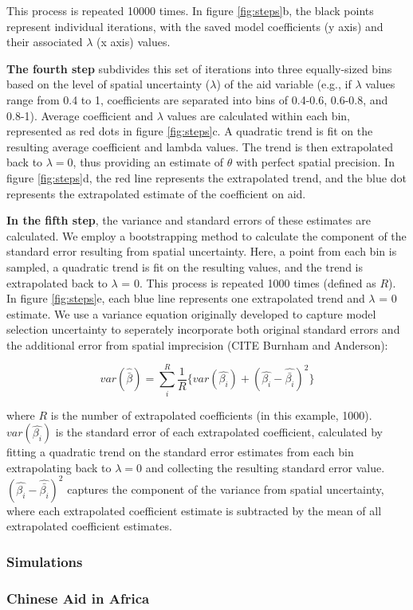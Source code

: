 This process is repeated 10000 times. 
In figure \ref{fig:steps}b, the black points represent individual iterations, with the saved model coefficients (y axis) and their associated $\lambda$ (x axis) values. 
\par
\textbf{The fourth step} subdivides this set of iterations into three equally-sized bins based on the level of spatial uncertainty ($\lambda$) of the aid variable (e.g., if $\lambda$ values range from 0.4 to 1, coefficients are separated into bins of 0.4-0.6, 0.6-0.8, and 0.8-1). 
Average coefficient and $\lambda$ values are calculated within each bin, represented as red dots in figure \ref{fig:steps}c. 
A quadratic trend is fit on the resulting average coefficient and lambda values. 
The trend is then extrapolated back to $\lambda=0$, thus providing an estimate of $\theta$ with perfect spatial precision. 
In figure \ref{fig:steps}d, the red line represents the extrapolated trend, and the blue dot represents the extrapolated estimate of the coefficient on aid. 
\par 

\textbf{In the fifth step}, the variance and standard errors of these estimates are calculated. 
We employ a bootstrapping method to calculate the component of the standard error resulting from spatial uncertainty. Here, a point from each bin is sampled, a quadratic trend is fit on the resulting values, and the trend is extrapolated back to $\lambda$ = 0. 
This process is repeated 1000 times (defined as $R$). 
In figure \ref{fig:steps}e, each blue line represents one extrapolated trend and $\lambda$ = 0 estimate. 
We use a variance equation originally developed to capture model selection uncertainty to seperately incorporate both original standard errors and the additional error from spatial imprecision (CITE Burnham and Anderson):

\begin{equation}\label{variance}
var(\hat{\bar{\beta}}) = \sum_i^R \frac{1}{R} \{ var(\hat{\beta_i}) + (\hat{\beta_i}-\hat{\bar{\beta_i}})^2 \}
\end{equation}

\noindent where $R$ is the number of extrapolated coefficients (in this example, 1000). 
$var(\hat{\beta_i})$ is the standard error of each extrapolated coefficient, calculated by fitting a quadratic trend on the standard error estimates from each bin extrapolating back to $\lambda=0$ and collecting the resulting standard error value. 
$(\hat{\beta_i}-\hat{\bar{\beta_i}})^2$ captures the component of the variance from spatial uncertainty, where each extrapolated coefficient estimate is subtracted by the mean of all extrapolated coefficient estimates.  

\subsubsection{Simulations}


\subsubsection{Chinese Aid in Africa}
